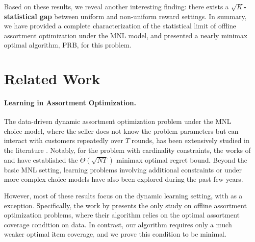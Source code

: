 \documentclass[10pt, letterpaper]{article}
\begin{document}
Based on these results, we reveal another interesting finding: there exists a \textbf{$\sqrt{K}$-statistical gap} between uniform and non-uniform reward settings. 
In summary, we have provided a complete characterization of the statistical limit of offline assortment optimization under the MNL model, and presented a nearly minimax optimal algorithm, PRB, for this problem. 





\section{Related Work}

\paragraph{Learning in Assortment Optimization.} The data-driven dynamic assortment optimization problem under the MNL choice model, where the seller does not know the problem parameters but can interact with customers repeatedly over $T$ rounds, has been extensively studied in the literature \citep{caro2007dynamic,rusmevichientong2010dynamic,saure2013optimal,agrawal2017thompson,agrawal2019mnl,chen2021optimal,saha2024stop}. 
Notably, for the problem with cardinality constraints, the works of \citet{agrawal2017thompson,agrawal2019mnl} and \citet{chen2018note} have established the $\widetilde{\Theta}(\sqrt{NT})$ minimax optimal regret bound. 
Beyond the basic MNL setting, learning problems involving additional constraints \citep{cheung2017assortment,aznag2021mnl,chen2024re} or under more complex choice models \citep{ou2018multinomial,oh2021multinomial,perivier2022dynamic,lee2024nearly,chen2021dynamic,li2022onlineassortment,zhang2024online} have also been explored during the past few years.

However, most of these results focus on the dynamic learning setting, with \citet{dong2023pasta} as a exception. Specifically, the work by \citet{dong2023pasta} presents the only study on offline assortment optimization problems, where their algorithm relies on the optimal assortment coverage condition on data. 
In contrast, our algorithm requires only a much weaker optimal item coverage, and we prove this condition to be minimal.
\end{document}
